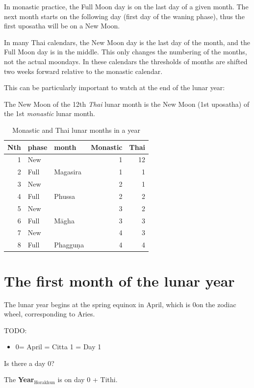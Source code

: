 \documentclass[11pt,oneside]{memoir-article}
\begin{document}
In monastic practice, the Full Moon day is on the last day of a given
month. The next month starts on the following day (first day of the
waning phase), thus the first uposatha will be on a New Moon.

In many Thai calendars, the New Moon day is the last day of the month,
and the Full Moon day is in the middle. This only changes the
numbering of the months, not the actual moondays. In these calendars
the thresholds of months are shifted two weeks forward relative to the
monastic calendar.

This can be particularly important to watch at the end of the lunar year:

The New Moon of the 12th \emph{Thai} lunar month is the New Moon (1st uposatha) of
the 1st \emph{monastic} lunar month.

\begin{table}[h]
\caption{\label{monastic-thai-year} Monastic and Thai lunar months in a year}
\centering
\begin{tabular}{rllrr}
Nth & phase & month & Monastic & Thai\\
\hline
1 & New &  & 1 & 12\\
2 & Full & Magasira & 1 & 1\\
3 & New &  & 2 & 1\\
4 & Full & Phussa & 2 & 2\\
5 & New &  & 3 & 2\\
6 & Full & Māgha & 3 & 3\\
7 & New &  & 4 & 3\\
8 & Full & Phagguṇa & 4 & 4\\
\end{tabular}
\end{table}

\section{The first month of the lunar year}
\label{sec-4-4}

The lunar year begins at the spring equinox in April, which is 0\degree on the
zodiac wheel, corresponding to Aries.

TODO:

\begin{itemize}
\item 0\degree = April = Citta 1 = Day 1
\end{itemize}

Is there a day 0?

The \textbf{Year$_{\text{Horakhun}}$} is on day 0 + Tithi.
\end{document}
